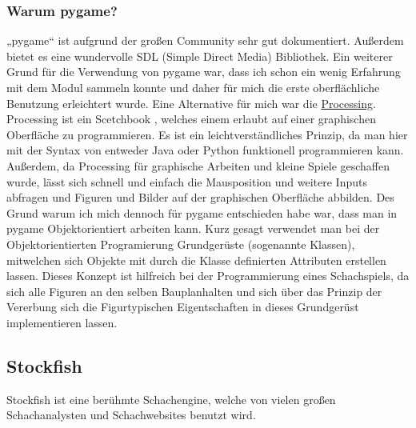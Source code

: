 \documentclass[a4paper, 10pt]{scrartcl}
\begin{document}
\subsubsection{Warum pygame?}
„pygame“ ist aufgrund der großen Community sehr gut dokumentiert.
Außerdem bietet es eine wundervolle SDL (Simple Direct Media) Bibliothek.
Ein weiterer Grund für die Verwendung von pygame war, dass ich schon ein
wenig Erfahrung mit dem Modul sammeln konnte und daher für mich die erste
oberflächliche Benutzung erleichtert wurde.
Eine Alternative für mich war die \href{https://processing.org/}{Processing}.
Processing ist ein \glqq Scetchbook \grqq , welches einem erlaubt
auf einer graphischen Oberfläche zu programmieren. Es ist ein leichtverständliches
Prinzip, da man hier mit der Syntax von entweder Java oder Python funktionell programmieren
kann. Außerdem, da Processing für graphische Arbeiten und kleine Spiele geschaffen wurde,
lässt sich schnell und einfach die Mausposition und weitere Inputs abfragen und
Figuren und Bilder auf der graphischen Oberfläche abbilden.
Des Grund warum ich mich dennoch für pygame entschieden habe war, dass man in pygame
Objektorientiert arbeiten kann. Kurz gesagt verwendet man bei der Objektorientierten Programierung
Grundgerüste (sogenannte Klassen), mitwelchen sich Objekte mit durch die Klasse definierten Attributen
erstellen lassen. Dieses Konzept ist hilfreich bei der Programmierung eines Schachspiels,
da sich alle Figuren an den selben \glqq Bauplan\grqq halten und sich über das Prinzip der Vererbung
sich die Figurtypischen Eigentschaften in dieses Grundgerüst implementieren lassen.

\subsection{Stockfish}
Stockfish ist eine berühmte Schachengine, welche von vielen großen Schachanalysten und Schachwebsites benutzt wird.
\end{document}
